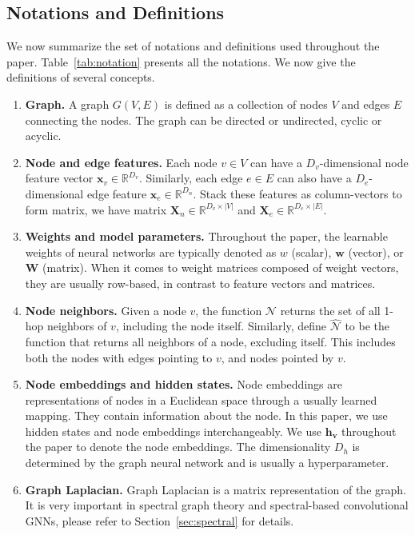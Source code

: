 \subsection{Notations and Definitions}
We now summarize the set of notations and definitions used throughout the paper. Table~\ref{tab:notation} presents all the notations. We now give the definitions of several concepts. 
\begin{enumerate}
\item \textbf{Graph.} A graph $G(V, E)$ is defined as a collection of nodes $V$ and edges $E$ connecting the nodes. The graph can be directed or undirected, cyclic or acyclic. 
\item \textbf{Node and edge features.} Each node $v \in V$ can have a $D_v$-dimensional node feature vector $\mathbf{x}_v \in \mathbb{R}^{D_v}$. Similarly, each edge $e \in E$ can also have a $D_e$-dimensional edge feature $\mathbf{x}_e \in \mathbb{R}^{D_n}$. Stack these features as column-vectors to form matrix, we have matrix $\mathbf{X}_n \in \mathbb{R}^{D_v \times |V| }$ and $\mathbf{X}_e \in \mathbb{R}^{D_e \times |E|}$.
\item \textbf{Weights and model parameters.} Throughout the paper, the learnable weights of neural networks are typically denoted as $w$ (scalar), $\mathbf{w}$ (vector), or $\mathbf{W}$ (matrix). When it comes to weight matrices composed of weight vectors, they are usually row-based, in contrast to feature vectors and matrices. 
\item \textbf{Node neighbors.} Given a node $v$, the function $\mathcal {N}$ returns the set of all 1-hop neighbors of $v$, including the node itself. Similarly, define $\hat {\mathcal {N}}$ to be the function that returns all neighbors of a node, excluding itself. This includes both the nodes with edges pointing to $v$, and nodes pointed by $v$.
\item \textbf{Node embeddings and hidden states.} Node embeddings are representations of nodes in a Euclidean space through a usually learned mapping. They contain information about the node. In this paper, we use hidden states and node embeddings interchangeably. We use $\mathbf{h_v}$ throughout the paper to denote the node embeddings. The dimensionality $D_h$ is determined by the graph neural network and is usually a hyperparameter.
\item \textbf{Graph Laplacian.} Graph Laplacian is a matrix representation of the graph. It is very important in spectral graph theory and spectral-based convolutional GNNs, please refer to Section~\ref{sec:spectral} for details.
\end{enumerate}



